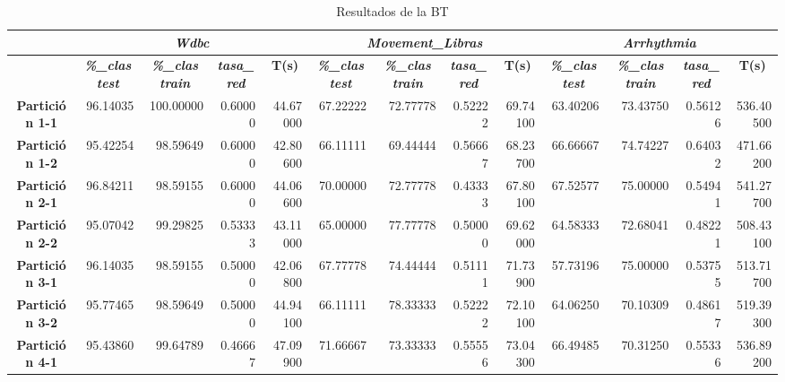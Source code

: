 \documentclass[a4paper,11pt]{article}
\begin{document}
  \begin{table}[H]	
    \caption*{Resultados de la BT}
    \begin{adjustbox}{width=1.1\textwidth}
    \begin{tabular}{|c|r|r|r|r|r|r|r|r|r|r|r|r|}
    \hline
    \multicolumn{1}{|l|}{} & \multicolumn{ 4}{c|}{\textbf{\textit{Wdbc}}} & \multicolumn{ 4}{c|}{\textbf{\textit{Movement\_Libras}}} & \multicolumn{ 4}{c|}{\textbf{\textit{Arrhythmia}}} \\ \hline
    & \multicolumn{1}{c|}{\textbf{\textit{\%\_clas test}}} & \multicolumn{1}{c|}{\textbf{\textit{\%\_clas train}}} & \multicolumn{1}{c|}{\textbf{\textit{tasa\_red}}} & \multicolumn{1}{c|}{\textbf{T(s)}} & \multicolumn{1}{c|}{\textbf{\textit{\%\_clas test}}} & \multicolumn{1}{c|}{\textbf{\textit{\%\_clas train}}} & \multicolumn{1}{c|}{\textbf{\textit{tasa\_red}}} & \multicolumn{1}{c|}{\textbf{T(s)}} & \multicolumn{1}{c|}{\textbf{\textit{\%\_clas test}}} & \multicolumn{1}{c|}{\textbf{\textit{\%\_clas train}}} & \multicolumn{1}{c|}{\textbf{\textit{tasa\_red}}} & \multicolumn{1}{c|}{\textbf{T(s)}} \\ \hline
    \textbf{Partición 1-1} & 96.14035 & 100.00000 & 0.60000 & 44.67000 & 67.22222 & 72.77778 & 0.52222 & 69.74100 & 63.40206 & 73.43750 & 0.56126 & 536.40500 \\ \hline
    \textbf{Partición 1-2} & 95.42254 & 98.59649 & 0.60000 & 42.80600 & 66.11111 & 69.44444 & 0.56667 & 68.23700 & 66.66667 & 74.74227 & 0.64032 & 471.66200 \\ \hline
    \textbf{Partición 2-1} & 96.84211 & 98.59155 & 0.60000 & 44.06600 & 70.00000 & 72.77778 & 0.43333 & 67.80100 & 67.52577 & 75.00000 & 0.54941 & 541.27700 \\ \hline
    \textbf{Partición 2-2} & 95.07042 & 99.29825 & 0.53333 & 43.11000 & 65.00000 & 77.77778 & 0.50000 & 69.62000 & 64.58333 & 72.68041 & 0.48221 & 508.43100 \\ \hline
    \textbf{Partición 3-1} & 96.14035 & 98.59155 & 0.50000 & 42.06800 & 67.77778 & 74.44444 & 0.51111 & 71.73900 & 57.73196 & 75.00000 & 0.53755 & 513.71700 \\ \hline
    \textbf{Partición 3-2} & 95.77465 & 98.59649 & 0.50000 & 44.94100 & 66.11111 & 78.33333 & 0.52222 & 72.10100 & 64.06250 & 70.10309 & 0.48617 & 519.39300 \\ \hline
    \textbf{Partición 4-1} & 95.43860 & 99.64789 & 0.46667 & 47.09900 & 71.66667 & 73.33333 & 0.55556 & 73.04300 & 66.49485 & 70.31250 & 0.55336 & 536.89200 \\ \hline

\end{tabular}
\end{adjustbox}
\end{table}
\end{document}
